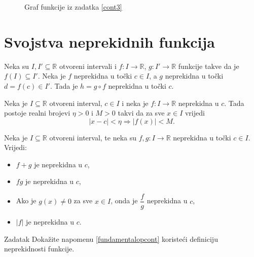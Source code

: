 \begin{proof*}
\begin{figure}[ht]
\begin{center}
\end{center}
\caption{Graf funkcije iz zadatka \ref{cont3}}
\end{figure}
\end{proof*}
\section{Svojstva neprekidnih funkcija}
\begin{remark}
\label{compcont}
Neka su \(I, I'\subseteq \mathbb{R}\) otvoreni intervali i \(f : I\to \mathbb{R}\), \(g : I'\to \mathbb{R}\) funkcije takve da je \(f(I)\subseteq I'\). Neka je \(f\) neprekidna u točki \(c\in I\), a \(g\) neprekidna u točki \(d=f(c)\in I'\). Tada je \(h=g\circ f\) neprekidna u točki \(c\).
\end{remark}
\begin{remark}
\label{localbound}
Neka je \(I\subseteq \mathbb{R}\) otvoreni interval, \(c\in I\) i neka je \(f : I\to \mathbb{R}\) neprekidna u \(c\). Tada postoje realni brojevi \(\eta>0\) i \(M>0\) takvi da za sve \(x\in I\) vrijedi
\[|x-c|<\eta\Longrightarrow |f(x)|<M.\]
\end{remark}
\begin{remark}
\label{fundamentalopcont}
Neka je \(I\subseteq \mathbb{R}\) otvoreni interval, te neka su \(f, g : I\to \mathbb{R}\) neprekidna u točki \(c\in I\). Vrijedi:
\begin{itemize}
\item[a)] \(f+g\) je neprekidna u \(c\),
\item[b)] \(fg\) je neprekidna u \(c\),
\item[c)] Ako je \(g(x)\neq 0\) za sve \(x\in I\), onda je \(\dfrac{f}{g}\) neprekidna u \(c\),
\item[d)] \(|f|\) je neprekidna u \(c\).
\end{itemize}
\end{remark}
\begin{exercise}{Zadatak}
Dokažite napomenu \ref{fundamentalopcont} koristeći definiciju neprekidnosti funkcije.
\end{exercise}
